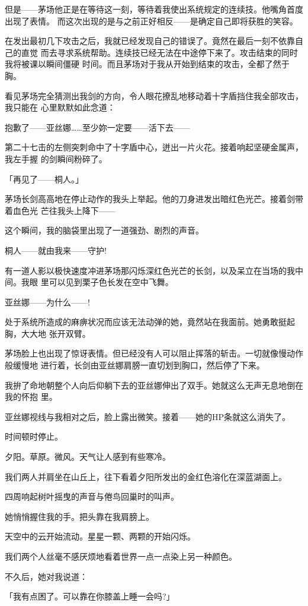 \documentclass[11pt]{book}
\begin{document}
但是——茅场他正是在等待这一刻，等待着我使出系统规定的连续技。他嘴角首度出现了表情。
而这次出现的是与之前正好相反——是确定自己即将获胜的笑容。

在发出最初几下攻击之后，我就已经发现自己的错误了。竟然在最后一刻不依靠自己的直觉
而去寻求系统帮助。连续技已经无法在中途停下来了。攻击结束的同时我将被课以瞬间僵硬
时间。而且茅场对于我从开始到结束的攻击，全都了然于胸。

看见茅场完全猜测出我剑的方向，令人眼花撩乱地移动着十字盾挡住我全部攻击，我只能在
心里默默如此念道：

抱歉了——亚丝娜……至少妳一定要——活下去——

第二十七击的左侧突刺命中了十字盾中心，迸出一片火花。接着响起坚硬金属声，我左手握
的剑瞬间粉碎了。

「再见了——桐人。」

茅场长剑高高地在停止动作的我头上举起。他的刀身进发出暗红色光芒。接着剑带着血色光
芒往我头上降下——

这个瞬间，我的脑袋里出现了一道强劲、剧烈的声音。

桐人——就由我来——守护!

有一道人影以极快速度冲进茅场那闪烁深红色光芒的长剑，以及呆立在当场的我中间。我眼
里可以见到栗子色长发在空中飞舞。

亚丝娜——为什么——!

处于系统所造成的麻痹状况而应该无法动弹的她，竟然站在我面前。她勇敢挺起胸，大大地
张开双臂。

茅场脸上也出现了惊讶表情。但已经没有人可以阻止挥落的斩击。一切就像慢动作般缓慢地
进行着，长剑由亚丝娜肩膀一直切划到胸口，然后停了下来。

我拚了命地朝整个人向后仰躺下去的亚丝娜伸出了双手。她就这么无声无息地倒在我的怀抱
里。

亚丝娜视线与我相对之后，脸上露出微笑。接着——她的HP条就这么消失了。

时间顿时停止。

夕阳。草原。微风。天气让人感到有些寒冷。

我们两人并肩坐在山丘上，往下看着夕阳所发出的金红色溶化在深蓝湖面上。

四周响起树叶摇曳的声音与倦鸟回巢时的叫声。

她悄悄握住我的手。把头靠在我肩膀上。

天空中的云开始流动。星星一颗、两颗的开始闪烁。

我们两个人丝毫不感厌烦地看着世界一点一点染上另一种颜色。

不久后，她对我说道：

「我有点困了。可以靠在你膝盖上睡一会吗?」
\end{document}
